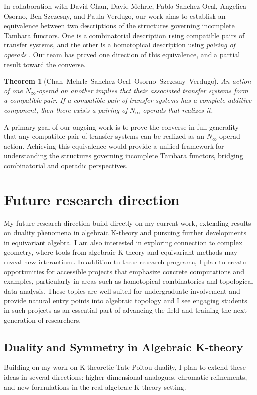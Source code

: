 \documentclass[11pt]{article}
\newtheorem{theorem}{Theorem}
\begin{document}
In collaboration with David Chan, David Mehrle, Pablo Sanchez Ocal, Angelica Osorno, Ben Szczesny, and Paula Verdugo, our work aims to establish an equivalence between two descriptions of the structures governing incomplete Tambara functors. 
One is a combinatorial description using compatible pairs of transfer systems, and the other is a homotopical description using {\it pairing of operads} \cite{MR2544392}. Our team has proved one direction of this equivalence, and a partial result toward the converse.
\begin{theorem}[Chan–Mehrle–Sanchez Ocal–Osorno–Szczesny–Verdugo]
An action of one $N_\infty$-operad on another implies that their associated transfer systems form a compatible pair.
If a compatible pair of transfer systems has a complete additive component, then there exists a pairing of $N_\infty$-operads that realizes it.
\end{theorem}
A primary goal of our ongoing work is to prove the converse in full generality--that any compatible pair of transfer systems can be realized as an $N_\infty$-operad action. Achieving this equivalence would provide a unified framework for understanding the structures governing incomplete Tambara functors, bridging combinatorial and operadic perspectives.


\section{Future research direction}

My future research direction build directly on my current work, extending results on duality phenomena in algebraic K-theory and pursuing further developments in equivariant algebra.
I am also interested in exploring connection to complex geometry, where tools from algebraic K-theory and equivariant methods may reveal new interactions.
In addition to these research programs, I plan to create opportunities for accessible projects that emphasize concrete computations and examples, particularly in areas such as homotopical combinatorics and topological data analysis.
These topics are well suited for undergraduate involvement and provide natural entry points into algebraic topology and I see engaging students in such projects as an essential part of advancing the field and training the next generation of researchers.

\subsection*{Duality and Symmetry in Algebraic K-theory}
Building on my work on K-theoretic Tate-Poitou duality, I plan to extend these ideas in several directions: higher-dimensional analogues, chromatic refinements, and new formulations in the real algebraic K-theory setting.
\end{document}
